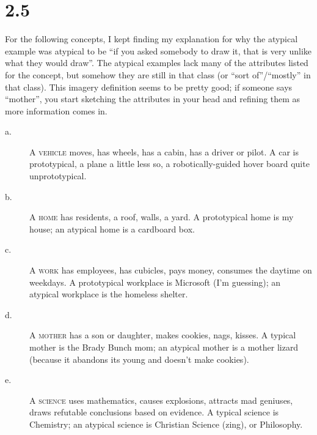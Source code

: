 \documentclass[12pt]{article}
\begin{document}
\section*{2.5}

For the following concepts, I kept finding my explanation for why the
atypical example was atypical to be ``if you asked somebody to draw it,
that is very unlike what they would draw''.  The atypical examples lack
many of the attributes listed for the concept, but somehow they are
still in that class (or ``sort of''/``mostly'' in that class).  This
imagery definition seems to be pretty good; if someone says ``mother'',
you start sketching the attributes in your head and refining them as
more information comes in.

\begin{description}
\item[a.] A \textsc{vehicle} moves, has wheels, has a cabin, has a
driver or pilot.  A car is prototypical, a plane a little less so, a
robotically-guided hover board quite unprototypical.
\item[b.] A \textsc{home} has residents, a roof, walls, a yard.  A
prototypical home is my house; an atypical home is a cardboard box.
\item[c.] A \textsc{work} has employees, has cubicles, pays money,
consumes the daytime on weekdays.  A prototypical workplace is
Microsoft (I'm guessing); an atypical workplace is the homeless shelter.
\item[d.] A \textsc{mother} has a son or daughter, makes cookies, nags,
kisses.  A typical mother is the Brady Bunch mom; an atypical mother is
a mother lizard (because it abandons its young and doesn't make
cookies).
\item[e.] A \textsc{science} uses mathematics, causes explosions,
attracts mad geniuses, draws refutable conclusions based on evidence.  A
typical science is Chemistry; an atypical science is Christian Science
(zing), or Philosophy.
\end{description}
\end{document}
